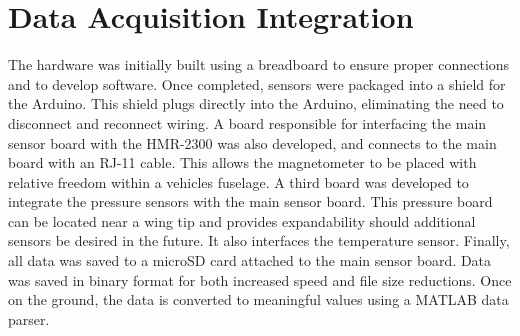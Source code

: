 \section{Data Acquisition Integration}
The hardware was initially built using a breadboard to ensure proper connections and to develop software. Once completed, sensors were packaged into a shield for the Arduino. This shield plugs directly into the Arduino, eliminating the need to disconnect and reconnect wiring. A board responsible for interfacing the main sensor board with the HMR-2300 was also developed, and connects to the main board with an RJ-11 cable. This allows the magnetometer to be placed with relative freedom within a vehicles fuselage. A third board was developed to integrate the pressure sensors with the main sensor board. This pressure board can be located near a wing tip and  provides expandability should additional sensors be desired in the future. It also interfaces the temperature sensor. Finally, all data was saved to a microSD card attached to the main sensor board. Data was saved in binary format for both increased speed and file size reductions. Once on the ground, the data is converted to meaningful values using a MATLAB data parser.
